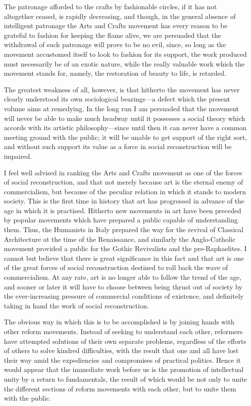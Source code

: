 \documentclass{book}
\begin{document}
The patronage afforded to the crafts by fashionable circles, if it has not altogether ceased, is rapidly decreasing, and though, in the general absence of intelligent patronage the Arts and Crafts movement has every reason to be grateful to fashion for keeping the flame alive, we are persuaded that the withdrawal of such patronage will prove to be no evil, since, so long as the movement accustomed itself to look to fashion for its support, the work produced must necessarily be of an exotic nature, while the really valuable work which the movement stands for, namely, the restoration of beauty to life, is retarded.

The greatest weakness of all, however, is that hitherto the movement has never clearly understood its own sociological bearings—a defect which the present volume aims at remedying. In the long run I am persuaded that the movement will never be able to make much headway until it possesses a social theory which accords with its artistic philosophy—since until then it can never have a common meeting ground with the public; it will be unable to get support of the right sort, and without such support its value as a force in social reconstruction will be impaired.

I feel well advised in ranking the Arts and Crafts movement as one of the forces of social reconstruction, and that not merely because art is the eternal enemy of commercialism, but because of the peculiar relation in which it stands to modern society. This is the first time in history that art has progressed in advance of the age in which it is practised. Hitherto new movements in art have been preceded by popular movements which have prepared a public capable of understanding them. Thus, the Humanists in Italy prepared the way for the revival of Classical Architecture at the time of the Renaissance, and similarly the Anglo-Catholic movement provided a public for the Gothic Revivalists and the pre-Raphaelites. I cannot but believe that there is great significance in this fact and that art is one of the great forces of social reconstruction destined to roll back the wave of commercialism. At any rate, art is no longer able to follow the trend of the age, and sooner or later it will have to choose between being thrust out of society by the ever-increasing pressure of commercial conditions of existence, and definitely taking in hand the work of social reconstruction.

The obvious way in which this is to be accomplished is by joining hands with other reform movements. Instead of seeking to understand each other, reformers have attempted solutions of their own separate problems, regardless of the efforts of others to solve kindred difficulties, with the result that one and all have lost their way amid the expediencies and compromises of practical politics. Hence it would appear that the immediate work before us is the promotion of intellectual unity by a return to fundamentals, the result of which would be not only to unite the different sections of reform movements with each other, but to unite them with the public.
\end{document}
